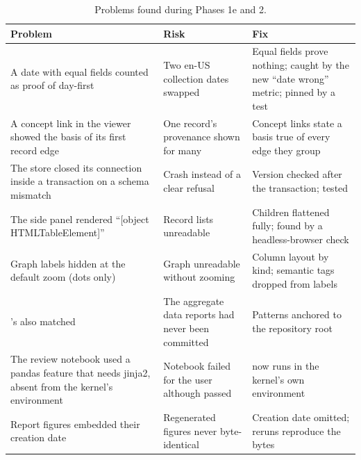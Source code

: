 \documentclass[11pt,a4paper]{article}
\newcommand{\code}[1]{\texttt{\detokenize{#1}}}
\begin{document}
\begin{table}[h]
\centering\footnotesize
\begin{tabularx}{\linewidth}{@{}>{\raggedright\arraybackslash}p{4.6cm}>{\raggedright\arraybackslash}X>{\raggedright\arraybackslash}p{4.0cm}@{}}
\toprule
Problem & Risk & Fix \\
\midrule
A date with equal fields counted as proof of day-first & Two en-US collection dates swapped & Equal fields prove nothing; caught by the new ``date wrong'' metric; pinned by a test \\
A concept link in the viewer showed the basis of its first record edge & One record's provenance shown for many & Concept links state a basis true of every edge they group \\
The store closed its connection inside a transaction on a schema mismatch & Crash instead of a clear refusal & Version checked after the transaction; tested \\
The side panel rendered ``[object HTMLTableElement]'' & Record lists unreadable & Children flattened fully; found by a headless-browser check \\
Graph labels hidden at the default zoom (dots only) & Graph unreadable without zooming & Column layout by kind; semantic tags dropped from labels \\
\code{.gitignore}'s \code{data/} also matched \code{docs/data/} & The aggregate data reports had never been committed & Patterns anchored to the repository root \\
The review notebook used a pandas feature that needs jinja2, absent from the kernel's environment & Notebook failed for the user although \code{make review} passed & \code{make review} now runs in the kernel's own environment \\
Report figures embedded their creation date & Regenerated figures never byte-identical & Creation date omitted; reruns reproduce the bytes \\
\bottomrule
\end{tabularx}
\caption{Problems found during Phases 1e and 2.}
\end{table}

\end{document}
